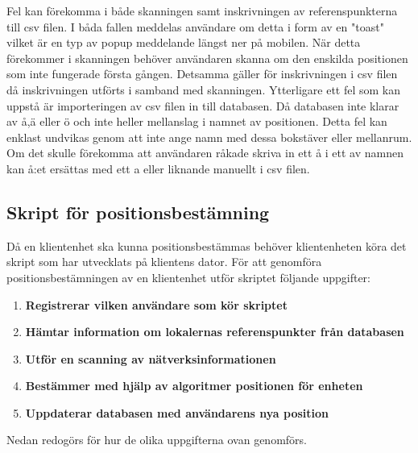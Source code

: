 \documentclass[swedish, a4paper,12pt]{article}
\begin{document}
Fel kan förekomma i både skanningen samt inskrivningen av referenspunkterna till csv filen. I båda fallen meddelas användare om detta i form av en "toast" vilket är en typ av popup meddelande längst ner på mobilen. När detta förekommer i skanningen behöver användaren skanna om den enskilda positionen som inte fungerade första gången. Detsamma gäller för inskrivningen i csv filen då inskrivningen utförts i samband med skanningen. Ytterligare ett fel som kan uppstå är importeringen av csv filen in till databasen. Då databasen inte klarar av å,ä eller ö och inte heller mellanslag i namnet av positionen. Detta fel kan enklast undvikas genom att inte ange namn med dessa bokstäver eller mellanrum. Om det skulle förekomma att användaren råkade skriva in ett å i ett av namnen kan å:et ersättas med ett a eller liknande manuellt i csv filen.%

\subsection{Skript för positionsbestämning}
Då en klientenhet ska kunna positionsbestämmas behöver klientenheten köra det skript som har utvecklats på klientens dator. För att genomföra positionsbestämningen av en klientenhet utför skriptet följande uppgifter:
\begin{enumerate}
  \item \textbf{Registrerar vilken användare som kör skriptet}
  \item \textbf{Hämtar information om lokalernas referenspunkter från databasen}
  \item \textbf{Utför en scanning av nätverksinformationen}
  \item \textbf{Bestämmer med hjälp av algoritmer positionen för enheten}
  \item \textbf{Uppdaterar databasen med användarens nya position}
\end{enumerate}

Nedan redogörs för hur de olika uppgifterna ovan genomförs. %
\end{document}
